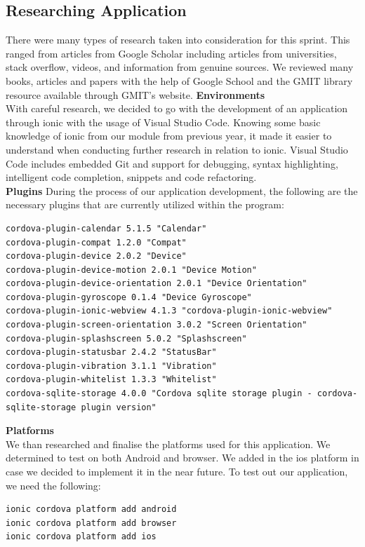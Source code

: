 \documentclass[a4paper,12pt]{report}
\begin{document}
\subsection{Researching Application}
There were many types of research taken into consideration for this sprint. This ranged from articles from Google Scholar including articles from universities, stack overflow, videos, and information from genuine sources. We reviewed many books, articles and papers with the help of Google School and the GMIT library resource available through GMIT's website.
\newpage
\textbf{Environments}\\
With careful research, we decided to go with the development of an application through ionic with the usage of Visual Studio Code. Knowing some basic knowledge of ionic from our module from previous year, it made it easier to understand when conducting further research in relation to ionic. Visual Studio Code includes embedded Git and support for debugging, syntax highlighting, intelligent code completion, snippets and code refactoring.\\
\textbf{Plugins}
During the process of our application development, the following are the necessary plugins that are currently utilized within the program:

\begin{lstlisting}
cordova-plugin-calendar 5.1.5 "Calendar"
cordova-plugin-compat 1.2.0 "Compat"
cordova-plugin-device 2.0.2 "Device"
cordova-plugin-device-motion 2.0.1 "Device Motion"
cordova-plugin-device-orientation 2.0.1 "Device Orientation"
cordova-plugin-gyroscope 0.1.4 "Device Gyroscope"
cordova-plugin-ionic-webview 4.1.3 "cordova-plugin-ionic-webview"
cordova-plugin-screen-orientation 3.0.2 "Screen Orientation"
cordova-plugin-splashscreen 5.0.2 "Splashscreen"
cordova-plugin-statusbar 2.4.2 "StatusBar"
cordova-plugin-vibration 3.1.1 "Vibration"
cordova-plugin-whitelist 1.3.3 "Whitelist"
cordova-sqlite-storage 4.0.0 "Cordova sqlite storage plugin - cordova-sqlite-storage plugin version"
\end{lstlisting} 
\textbf{Platforms}
\\
We than researched and finalise the platforms used for this application. We determined to test on both Android and browser. We added in the ios platform in case we decided to implement it in the near future. To test out our application, we need the following:
\begin{lstlisting}
ionic cordova platform add android
ionic cordova platform add browser
ionic cordova platform add ios
\end{lstlisting}
\end{document}
